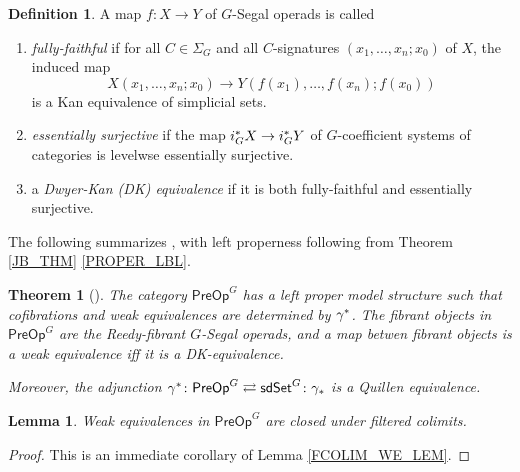 \documentclass[a4paper,10pt
,draft
]{article}%
\numberwithin{equation}{section}
\numberwithin{figure}{section}
\newtheorem{theorem}[equation]{Theorem}%
\newtheorem{lemma}[equation]{Lemma}%
\theoremstyle{definition} %
\newtheorem{definition}[equation]{Definition}%
\newcommand{\1}{\ensuremath{\mathbbm 1}}%
\begin{document}
\begin{definition}
      A map $f \colon X \to Y$ of $G$-Segal operads is called
      \begin{enumerate}[label = (\roman*)]
      \item \textit{fully-faithful} if for all $C \in \Sigma_G$ and all $C$-signatures $(x_1,\dots, x_n;x_0)$ of $X$, the induced map
            \[
                  X(x_1, \dots, x_n; x_0) \to Y(f(x_1), \dots, f(x_n); f(x_0))
            \]
            is a Kan equivalence of simplicial sets.
      \item \textit{essentially surjective} if the map 
      $i_G^{\**}X \to i_G^{\**}Y$ of $G$-coefficient systems of categories
            is levelwse essentially surjective.
      \item a \textit{Dwyer-Kan (DK) equivalence} if it is both fully-faithful and essentially surjective.
      \end{enumerate}
\end{definition}


The following summarizes \cite[Theorems 4.39, 4.42, and 5.48, and Corollary 5.51]{BP_edss},
with left properness following from Theorem \ref{JB_THM} \ref{PROPER_LBL}.
\begin{theorem}[\cite{BP_edss}]
      The category $\mathsf{PreOp}^G$ has a left proper model structure such that
      cofibrations and weak equivalences are determined by $\gamma^{\**}$.
      The fibrant objects in $\mathsf{PreOp}^G$ are the Reedy-fibrant $G$-Segal operads,
      and a map betwen fibrant objects is a weak equivalence iff it is a DK-equivalence.
      
      Moreover, the adjunction $\gamma^{\**} \colon \mathsf{PreOp}^G \rightleftarrows \mathsf{sdSet}^G \colon \gamma_{\**}$
      is a Quillen equivalence.
\end{theorem}

\begin{lemma}
      \label{FCOLIM_WE2_LEM}
      Weak equivalences in $\mathsf{PreOp}^G$ are closed under filtered colimits.
\end{lemma}
\begin{proof}
      This is an immediate corollary of Lemma \ref{FCOLIM_WE_LEM}.
\end{proof}
\end{document}
